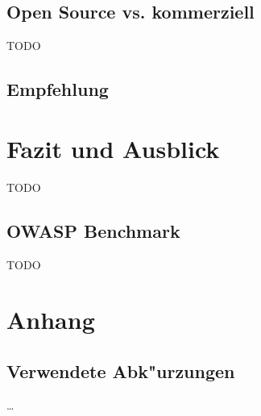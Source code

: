 \documentclass[12pt,oneside,a4paper,parskip]{scrbook}
\begin{document}
  \section{Open Source vs. kommerziell}
  TODO
  \section{Empfehlung}


\chapter{Fazit und Ausblick}
TODO
  \section{OWASP Benchmark}
  TODO


\backmatter



\cleardoublepage
{}
{}
\printbibliography[title=Quellenverzeichnis]

\appendix
  \chapter*{Anhang}

  \section{Verwendete Abk"urzungen}
  \dots{}
\end{document}
